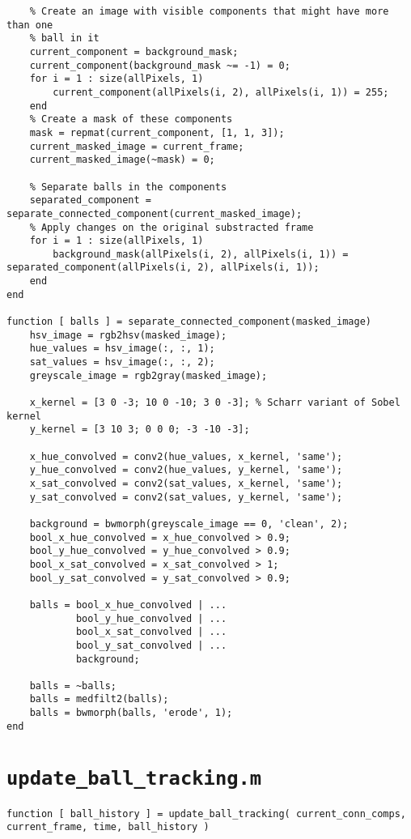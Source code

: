 \documentclass[12pt,a4paper]{article}
\begin{document}
\begin{appendices}
\begin{verbatim}
    % Create an image with visible components that might have more than one
    % ball in it
    current_component = background_mask;
    current_component(background_mask ~= -1) = 0;
    for i = 1 : size(allPixels, 1)
        current_component(allPixels(i, 2), allPixels(i, 1)) = 255;
    end
    % Create a mask of these components
    mask = repmat(current_component, [1, 1, 3]);
    current_masked_image = current_frame;
    current_masked_image(~mask) = 0;
        
    % Separate balls in the components
    separated_component = separate_connected_component(current_masked_image);
    % Apply changes on the original substracted frame
    for i = 1 : size(allPixels, 1)
        background_mask(allPixels(i, 2), allPixels(i, 1)) = separated_component(allPixels(i, 2), allPixels(i, 1));
    end
end

function [ balls ] = separate_connected_component(masked_image)
    hsv_image = rgb2hsv(masked_image);
    hue_values = hsv_image(:, :, 1);
    sat_values = hsv_image(:, :, 2);
    greyscale_image = rgb2gray(masked_image);
  
    x_kernel = [3 0 -3; 10 0 -10; 3 0 -3]; % Scharr variant of Sobel kernel
    y_kernel = [3 10 3; 0 0 0; -3 -10 -3]; 
    
    x_hue_convolved = conv2(hue_values, x_kernel, 'same');
    y_hue_convolved = conv2(hue_values, y_kernel, 'same');
    x_sat_convolved = conv2(sat_values, x_kernel, 'same'); 
    y_sat_convolved = conv2(sat_values, y_kernel, 'same');
    
    background = bwmorph(greyscale_image == 0, 'clean', 2);
    bool_x_hue_convolved = x_hue_convolved > 0.9;
    bool_y_hue_convolved = y_hue_convolved > 0.9;
    bool_x_sat_convolved = x_sat_convolved > 1;
    bool_y_sat_convolved = y_sat_convolved > 0.9;
    
    balls = bool_x_hue_convolved | ...
            bool_y_hue_convolved | ...
            bool_x_sat_convolved | ...
            bool_y_sat_convolved | ...
            background;
      
    balls = ~balls;
    balls = medfilt2(balls);
    balls = bwmorph(balls, 'erode', 1);  
end
\end{verbatim}

\chapter{\texttt{update\_ball\_tracking.m}}
\begin{verbatim}
function [ ball_history ] = update_ball_tracking( current_conn_comps, current_frame, time, ball_history )


\end{verbatim}
\end{appendices}
\end{document}
